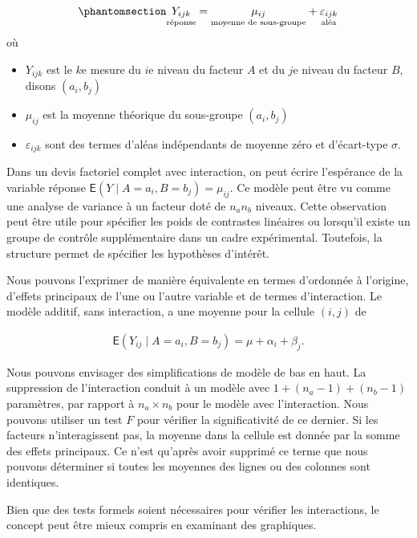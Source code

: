 \documentclass[
  11pt,
  letterpaper,
]{scrbook}
\providecommand{\tightlist}{%
  \setlength{\itemsep}{0pt}\setlength{\parskip}{0pt}}\usepackage{longtable,booktabs,array}
\theoremstyle{definition}
\theoremstyle{plain}
\theoremstyle{definition}
\theoremstyle{plain}
\theoremstyle{remark}
\begin{document}
\begin{equation}\phantomsection\label{eq-twowayasoneway}{
\underset{\text{réponse}\vphantom{b}}{Y_{ijk}} = \underset{\text{moyenne de sous-groupe}}{\mu_{ij}} + \underset{\text{aléa}}{\varepsilon_{ijk}}
}\end{equation} où

\begin{itemize}
\tightlist
\item
  \(Y_{ijk}\) est le \(k\)e mesure du \(i\)e niveau du facteur \(A\) et
  du \(j\)e niveau du facteur \(B\), disons \((a_i, b_j)\)
\item
  \(\mu_{ij}\) est la moyenne théorique du sous-groupe \((a_i, b_j)\)
\item
  \(\varepsilon_{ijk}\) sont des termes d'aléas indépendants de moyenne
  zéro et d'écart-type \(\sigma\).
\end{itemize}

Dans un devis factoriel complet avec interaction, on peut écrire
l'espérance de la variable réponse
\(\mathsf{E}(Y \mid A=a_i, B=b_j) = \mu_{ij}\). Ce modèle peut être vu
comme une analyse de variance à un facteur doté de \(n_an_b\) niveaux.
Cette observation peut être utile pour spécifier les poids de contrastes
linéaires ou lorsqu'il existe un groupe de contrôle supplémentaire dans
un cadre expérimental. Toutefois, la structure permet de spécifier les
hypothèses d'intérêt.

Nous pouvons l'exprimer de manière équivalente en termes d'ordonnée à
l'origine, d'effets principaux de l'une ou l'autre variable et de termes
d'interaction. Le modèle additif, sans interaction, a une moyenne pour
la cellule \((i,j)\) de

\begin{align*}
\mathsf{E}(Y_{ij} \mid A = a_i, B=b_j) = \mu + \alpha_i + \beta_j.
\end{align*}

Nous pouvons envisager des simplifications de modèle de bas en haut. La
suppression de l'interaction conduit à un modèle avec
\(1 + (n_a-1) + (n_b-1)\) paramètres, par rapport à \(n_a \times n_b\)
pour le modèle avec l'interaction. Nous pouvons utiliser un test \(F\)
pour vérifier la significativité de ce dernier. Si les facteurs
n'interagissent pas, la moyenne dans la cellule est donnée par la somme
des effets principaux. Ce n'est qu'après avoir supprimé ce terme que
nous pouvons déterminer si toutes les moyennes des lignes ou des
colonnes sont identiques.

Bien que des tests formels soient nécessaires pour vérifier les
interactions, le concept peut être mieux compris en examinant des
graphiques.
\end{document}
